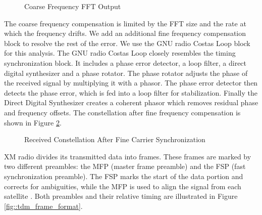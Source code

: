 \documentclass[conference,onecolumn]{IEEEtran}
\begin{document}
\begin{figure}[H]
	\centerline{}
	\caption{Coarse Frequency FFT Output}
	\label{fig::cfo_frequency_estimate}
\end{figure}

The coarse frequency compensation is limited by the FFT size and the rate at which the frequency drifts. We add an additional fine frequency compensation block to resolve the rest of the error. We use the GNU radio Costas Loop block for this analysis. The GNU radio Costas Loop closely resembles the timing synchronization block. It includes a phase error detector, a loop filter, a direct digital synthesizer and a phase rotator.
The phase rotator adjusts the phase of the received signal by multiplying it with a phasor. The phase error detector then detects the phase error, which is fed into a loop filter for stabilization. Finally the Direct Digital Synthesizer creates a coherent phasor which removes residual phase and frequency offsets. The constellation after fine frequency compensation is shown in Figure \ref{fig::constellation_after_fine_carrier_comp}.

\begin{figure}[H]
	\centerline{}
	\caption{Received Constellation After Fine Carrier Synchronization}
	\label{fig::constellation_after_fine_carrier_comp}
\end{figure}

XM radio divides its transmitted data into frames. These frames are marked by two different preambles: the MFP (master frame preamble) and the FSP (fast synchronization preamble). The FSP marks the start of the data portion and corrects for ambiguities, while the MFP is used to align the signal from each satellite \cite{a2008_us8260192b2}. Both preambles and their relative timing are illustrated in Figure \ref{fig::tdm_frame_format}.
\end{document}
